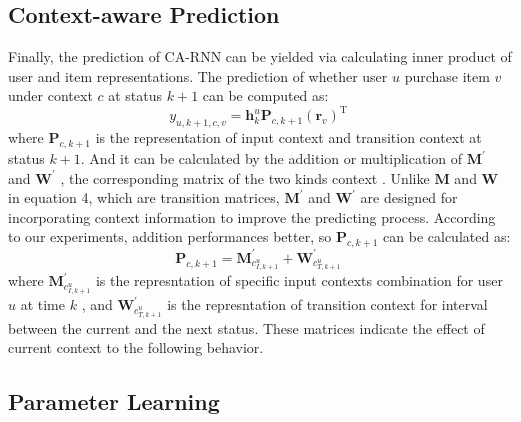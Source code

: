 \documentclass[conference]{IEEEtran}
\begin{document}
\subsection{Context-aware Prediction}

Finally, the prediction of CA-RNN can be yielded via calculating inner product of user and item representations. The prediction of whether user $u$ purchase item $v$  under context $c$ at status $k+1$ can be computed as:
\begin{equation}
y_{u, k+1, c, v} = \mathbf{h}_{k}^{u}\mathbf{P}_{c, k+1}(\mathbf{r}_{v})^ \mathrm{ T }~
\end{equation}
where $\mathbf{P}_{c, k+1}$ is the representation of input context and transition context at status $k+1$. And it can be calculated by the addition or multiplication of $\mathbf{M}^{'}$ and $\mathbf{W}^{'}$ , the corresponding matrix of the two kinds context . Unlike $\mathbf{M}$ and $\mathbf{W}$ in equation 4, which are transition matrices, $\mathbf{M}^{'}$ and $\mathbf{W}^{'}$ are designed for incorporating context information to improve the predicting process. According to our experiments, addition performances better, so $\mathbf{P}_{c, k+1}$ can be calculated as:
\begin{equation}   \label{eqPadd}
\mathbf{P}_{c, k+1}=\mathbf{M}_{c_{I,k+1}^{u}}^{'} + \mathbf{W}_{c_{T,k+1}^{u}}^{'}~
\end{equation}
where $\mathbf{M}_{c_{I,k+1}^{u}}^{'}$ is the represntation of specific input contexts combination for user $u$ at time $k$ , and $\mathbf{W}_{c_{T,k+1}^{u}}^{'}$ is the represntation of transition context for interval between the current and the next status. These matrices indicate the effect of current context to the following behavior.




\subsection{Parameter Learning}
\end{document}
